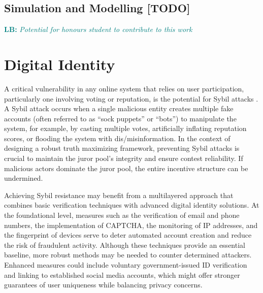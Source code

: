 \documentclass{article}
\newcommand{\lucas}[1]{\textcolor{teal}{\textbf{LB: }\textit{#1}}}
\begin{document}
\subsection{Simulation and Modelling [TODO]}


\lucas{Potential for honours student to contribute to this work}

\fi

\section{Digital Identity}
\label{sec:digital-identity}

A critical vulnerability in any online system that relies on user participation, particularly one involving voting or reputation, is the potential for Sybil attacks \cite{sybil:2002}.  A Sybil attack occurs when a single malicious entity creates multiple fake accounts (often referred to as ``sock puppets'' or ``bots'') to manipulate the system, for example, by casting multiple votes, artificially inflating reputation scores, or flooding the system with dis/misinformation.  In the context of designing a robust truth maximizing framework, preventing Sybil attacks is crucial to maintain the juror pool’s integrity and ensure contest reliability. If malicious actors dominate the juror pool, the entire incentive structure can be undermined.

Achieving Sybil resistance may benefit from a multilayered approach that combines basic verification techniques with advanced digital identity solutions. At the foundational level, measures such as the verification of email and phone numbers, the implementation of CAPTCHA, the monitoring of IP addresses, and the fingerprint of devices serve to deter automated account creation and reduce the risk of fraudulent activity. Although these techniques provide an essential baseline, more robust methods may be needed to counter determined attackers. Enhanced measures could include voluntary government-issued ID verification and linking to established social media accounts, which might offer stronger guarantees of user uniqueness while balancing privacy concerns.
\end{document}

